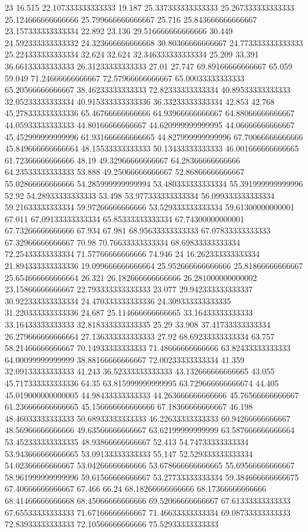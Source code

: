 23 16.515 22.107333333333333 19.187 25.337333333333333 25.267333333333333 25.124666666666666 25.799666666666667 25.716 25.843666666666667 23.157333333333334 22.892 23.136 29.516666666666666 30.449 24.592333333333332 24.323666666666668 30.80366666666667 24.773333333333333 25.224333333333334 32.624 32.624 32.346333333333334 25.209 33.391 36.66133333333333 26.31233333333333 27.01 27.747 69.89166666666667 65.059 59.049 71.24666666666667 72.57966666666667 65.00033333333333 65.20566666666667 38.46233333333333 72.82333333333334 40.89533333333333 32.05233333333334 40.915333333333336 36.33233333333334 42.853 42.768 45.278333333333336 65.46766666666666 64.93966666666667 64.88066666666667 44.05933333333333 44.80166666666667 44.620999999999995 44.06666666666667 45.452999999999996 61.931666666666665 44.827999999999996 67.70066666666666 45.849666666666664 48.15533333333333 50.13433333333333 46.001666666666665 61.72366666666666 48.19 49.32966666666667 64.28366666666666 64.23533333333333 53.888 49.25066666666667 52.86866666666667 55.02866666666666 54.285999999999994 53.480333333333334 55.391999999999996 52.92 54.28933333333333 53.498 53.977333333333334 56.099333333333334 59.21633333333334 59.97266666666666 53.529333333333334 59.61300000000001 67.011 67.09133333333334 65.85333333333334 67.74300000000001 67.73266666666666 67.934 67.981 68.95633333333333 67.07833333333333 67.32966666666667 70.98 70.76633333333334 68.69833333333334 72.25433333333334 71.57766666666666 74.946
24 16.262333333333334 21.894333333333336 19.099666666666664 25.952666666666666 25.81866666666667 25.654666666666664 26.321 26.182666666666666 26.281000000000002 23.15866666666667 22.793333333333333 23.077 29.942333333333337 30.922333333333334 24.470333333333336 24.309333333333335 31.220333333333336 24.687 25.114666666666665 33.16433333333333 33.16433333333333 32.818333333333335 25.29 33.908 37.41733333333334 26.279666666666664 27.136333333333333 27.92 68.69233333333334 63.757 58.21466666666667 70.14933333333333 71.48666666666666 63.82433333333333 64.00099999999999 38.88166666666667 72.00233333333334 41.359 32.09133333333333 41.243 36.52333333333333 43.132666666666665 43.055 45.717333333333336 64.35 63.815999999999995 63.729666666666674 44.405 45.019000000000005 44.98433333333333 44.263666666666666 45.76566666666667 61.236666666666665 45.156666666666666 67.18366666666667 46.198 48.46033333333333 50.68933333333333 46.22633333333333 60.94266666666667 48.56966666666666 49.63566666666667 63.62199999999999 63.587666666666664 53.452333333333335 48.93866666666667 52.413 54.74733333333334 53.943666666666665 53.09133333333333 55.147 52.529333333333334 54.02366666666667 53.04266666666666 53.678666666666665 55.69566666666667 58.961999999999996 59.61566666666667 53.27733333333334 59.384666666666675 67.40666666666667 67.466 66.24 68.18266666666666 68.17366666666666 68.41466666666668 68.45066666666666 69.52066666666667 67.61333333333333 67.65533333333333 71.67166666666667 71.46633333333334 69.08733333333333 72.83933333333333 72.10566666666666 75.52933333333333
